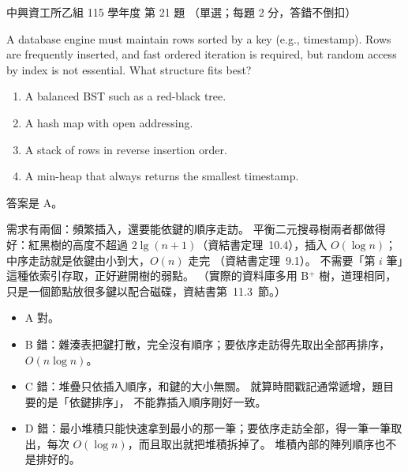 \begin{pastexam}[label={px:nchu-115-is-21}]{中興資工所乙組 115 學年度 第 21 題}
（單選；每題 2 分，答錯不倒扣）

A database engine must maintain rows sorted by a key (e.g., timestamp). Rows are frequently
inserted, and fast ordered iteration is required, but random access by index is not essential.
What structure fits best?
\begin{enumerate}[label=\Alph*.,nosep]
\item A balanced BST such as a red-black tree.
\item A hash map with open addressing.
\item A stack of rows in reverse insertion order.
\item A min-heap that always returns the smallest timestamp.
\end{enumerate}
\end{pastexam}

\begin{pastsoln}
答案是 A。

需求有兩個：頻繁插入，還要能依鍵的順序走訪。 平衡二元搜尋樹兩者都做得好：紅黑樹的高度不超過
$2\lg(n + 1)$（資結書定理~10.4），插入 $O(\log n)$；中序走訪就是依鍵由小到大，$O(n)$ 走完
（資結書定理~9.1）。 不需要「第 $i$ 筆」這種依索引存取，正好避開樹的弱點。 （實際的資料庫多用
B$^{+}$ 樹，道理相同，只是一個節點放很多鍵以配合磁碟，資結書第~11.3~節。）
\begin{itemize}
\item A 對。
\item B 錯：雜湊表把鍵打散，完全沒有順序；要依序走訪得先取出全部再排序，$O(n \log n)$。
\item C 錯：堆疊只依插入順序，和鍵的大小無關。 就算時間戳記通常遞增，題目要的是「依鍵排序」，
不能靠插入順序剛好一致。
\item D 錯：最小堆積只能快速拿到最小的那一筆；要依序走訪全部，得一筆一筆取出，每次
$O(\log n)$，而且取出就把堆積拆掉了。 堆積內部的陣列順序也不是排好的。
\end{itemize}
\end{pastsoln}
